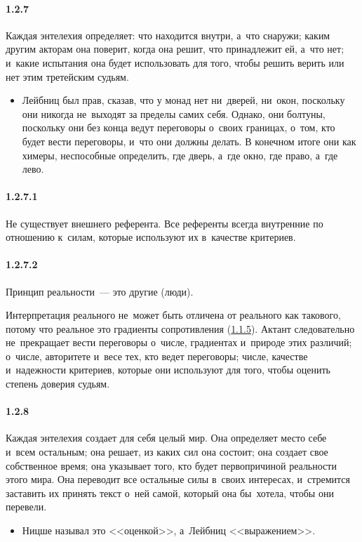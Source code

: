 \paragraph{1.2.7}\hypertarget{par:1.2.7}{} Каждая энтелехия определяет: что находится внутри, а~что снаружи; каким другим акторам она поверит, когда она решит, что принадлежит ей, а~что нет; и~какие испытания она будет использовать для того, чтобы решить верить или нет этим третейским судьям. 
	\begin{itemize}
	\item Лейбниц был прав, сказав, что у монад нет ни~дверей, ни~окон, поскольку они никогда не~выходят за пределы самих себя. Однако, они болтуны, поскольку они без конца ведут переговоры о~своих границах, о~том, кто будет вести переговоры, и~что они должны делать. В конечном итоге они как химеры, неспособные определить, где дверь, а~где окно, где право, а~где лево.
	\end{itemize}

\paragraph{1.2.7.1}\hypertarget{par:1.2.7.1}{} Не существует внешнего референта. Все референты всегда внутренние по отношению к~силам, которые используют их в~качестве критериев.

\paragraph{1.2.7.2}\hypertarget{par:1.2.7.2}{} Принцип реальности~--- это другие (люди).
	\begin{itemize}
	Интерпретация реального не~может быть отличена от реального как такового, потому что реальное это градиенты сопротивления (\hyperlink{par:1.1.5}{1.1.5}). Актант следовательно не~прекращает вести переговоры о~числе, градиентах и~природе этих различий; о~числе, авторитете и~весе тех, кто ведет переговоры; числе, качестве и~надежности критериев, которые они используют для того, чтобы оценить степень доверия судьям.
	\end{itemize}

\paragraph{1.2.8}\hypertarget{par:1.2.8}{} Каждая энтелехия создает для себя целый мир. Она определяет место себе и~всем остальным; она решает, из каких сил она состоит; она создает свое собственное время; она указывает того, кто будет первопричиной реальности этого мира. Она переводит все остальные силы в~своих интересах, и~стремится заставить их принять текст о~ней самой, который она бы~хотела, чтобы они перевели.
	\begin{itemize}
	\item Ницше называл это <<оценкой>>, а~Лейбниц <<выражением>>.
	\end{itemize}

